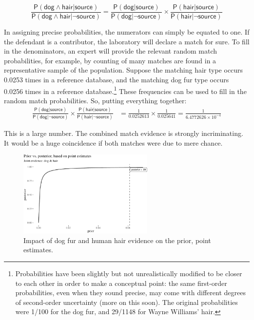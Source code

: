 \documentclass[
  letterpaper,
  DIV=11,
  numbers=noendperiod]{scrartcl}
\newcommand{\pr}[1]{\mathsf{P}(#1)}
\newcommand{\s}[1]{\mbox{$\mathsf{#1}$}}
\begin{document}
\[
\frac{{\pr{\s{dog} \wedge \s{hair}  \vert \s{source}}}}{{\pr{\s{dog} \wedge \s{hair} \vert \neg \s{source}}}} = \frac{{\pr{\s{dog} \vert \s{source}}}}{{\pr{\s{dog}  \vert \neg \s{source}}}} \times
 \frac{{\pr{\s{hair} \vert \s{source}}}}{{\pr{\s{hair} \vert \neg \s{source}}}}
\]

\noindent In assigning precise probabilities, the numerators can simply
be equated to one. If the defendant is a contributor, the laboratory
will declare a match for sure. To fill in the denominators, an expert
will provide the relevant random match probabilities, for example, by
counting of many matches are found in a representative sample of the
population. Suppose the matching hair type occurs 0.0253 times in a
reference database, and the matching dog fur type occurs 0.0256 times in
a reference database.\footnote{Probabilities have been slightly but not
  unrealistically modified to be closer to each other in order to make a
  conceptual point: the same first-order probabilities, even when they
  sound precise, may come with different degrees of second-order
  uncertainty (more on this soon). The original probabilities were 1/100
  for the dog fur, and 29/1148 for Wayne Williams' hair.} These
frequencies can be used to fill in the random match probabilities. So,
putting everything together: \begin{align*}
\frac{{\pr{\s{dog} \vert \s{source}}}}{{\pr{\s{dog}  \vert \neg \s{source}}}} \times
 \frac{{\pr{\s{hair} \vert \s{source}}}}{{\pr{\s{hair} \vert \neg \s{source}}}}
& =  \frac{1}{0.0252613} \times  \frac{1}{0.025641} = \frac{1}{\ensuremath{6.4772626\times 10^{-4}}}
\end{align*}

\noindent This is a large number. The combined match evidence is
strongly incriminating. It would be a huge coincidence if both matches
were due to mere chance.

\begin{figure}[H]

{\centering \includegraphics[width=0.6\textwidth,height=\textheight]{imp_philosophical_backup_files/figure-pdf/fig-impactOfPoint-1.pdf}

}

\caption{\label{fig-impactOfPoint}Impact of dog fur and human hair
evidence on the prior, point estimates.}

\end{figure}
\end{document}
